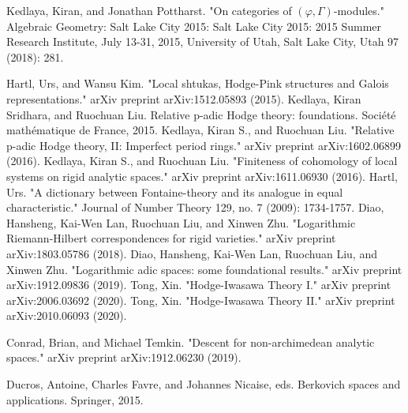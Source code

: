 \documentclass[12pt]{amsart}
\theoremstyle{definition}
\numberwithin{equation}{section}
\begin{document}

\begin{thebibliography}{10}

 Kedlaya, Kiran, and Jonathan Pottharst. "On categories of $(\varphi, \Gamma)$-modules." Algebraic Geometry: Salt Lake City 2015: Salt Lake City 2015: 2015 Summer Research Institute, July 13-31, 2015, University of Utah, Salt Lake City, Utah 97 (2018): 281.




Hartl, Urs, and Wansu Kim. "Local shtukas, Hodge-Pink structures and Galois representations." arXiv preprint arXiv:1512.05893 (2015).
 Kedlaya, Kiran Sridhara, and Ruochuan Liu. Relative p-adic Hodge theory: foundations. Soci\'et\'e math\'ematique de France, 2015.
 Kedlaya, Kiran S., and Ruochuan Liu. "Relative p-adic Hodge theory, II: Imperfect period rings." arXiv preprint arXiv:1602.06899 (2016).
 Kedlaya, Kiran S., and Ruochuan Liu. "Finiteness of cohomology of local systems on rigid analytic spaces." arXiv preprint arXiv:1611.06930 (2016).
Hartl, Urs. "A dictionary between Fontaine-theory and its analogue in equal characteristic." Journal of Number Theory 129, no. 7 (2009): 1734-1757. 
 Diao, Hansheng, Kai-Wen Lan, Ruochuan Liu, and Xinwen Zhu. "Logarithmic Riemann-Hilbert correspondences for rigid varieties." arXiv preprint arXiv:1803.05786 (2018). 
 Diao, Hansheng, Kai-Wen Lan, Ruochuan Liu, and Xinwen Zhu. "Logarithmic adic spaces: some foundational results." arXiv preprint arXiv:1912.09836 (2019).
 Tong, Xin. "Hodge-Iwasawa Theory I." arXiv preprint arXiv:2006.03692 (2020).
 Tong, Xin. "Hodge-Iwasawa Theory II." arXiv preprint arXiv:2010.06093 (2020).

 Conrad, Brian, and Michael Temkin. "Descent for non-archimedean analytic spaces." arXiv preprint arXiv:1912.06230 (2019). 

 Ducros, Antoine, Charles Favre, and Johannes Nicaise, eds. Berkovich spaces and applications. Springer, 2015.


\end{thebibliography}
\end{document}
